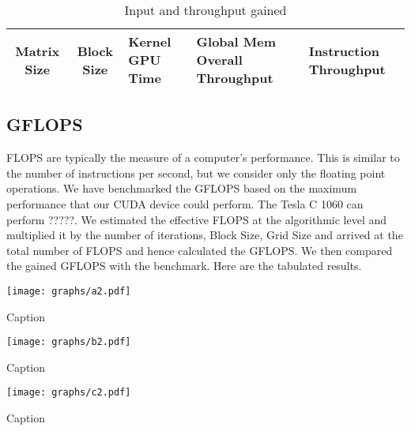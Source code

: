 \documentclass[10pt]{article}
\makeatletter
\newenvironment{figurehere}
    {\def\@captype{figure}}
    {}
\makeatother
\begin{document}
\begin{multicols}{2}
    \begin{table}\footnotesize
    \centering
        \begin{tabular}{ | c | c | p{1.2cm} | p{1.5cm} | p{1.0cm} | }
        \hline
        Matrix Size & Block Size & Kernel GPU Time & Global Mem Overall Throughput & Instruction Throughput \\
        \hline
        \end{tabular}
        \caption{Input and throughput gained}
        \label{tab:input_throughput}
    \end{table}

    \subsection{GFLOPS}
    FLOPS are typically the measure of a computer’s performance.
    This is similar to the number of instructions per second, but we consider only the floating point operations.
    We have benchmarked the GFLOPS based on the maximum performance that our CUDA device could perform.
    The Tesla C 1060 can perform ?????.
    We estimated the effective FLOPS at the algorithmic level and multiplied it by the number of iterations, Block Size, Grid Size and arrived at the total number of FLOPS and hence calculated the GFLOPS.
    We then compared the gained GFLOPS with the benchmark.
    Here are the tabulated results.

    \begin{center}
    \begin{figurehere}
        \texttt{[image: graphs/a2.pdf]}
        \caption{Caption}
        \label{fig:gflops1}
    \end{figurehere}
    \end{center}

    \begin{center}
    \begin{figurehere}
        \texttt{[image: graphs/b2.pdf]}
        \caption{Caption}
        \label{fig:gflops2}
    \end{figurehere}
    \end{center}

    \begin{center}
    \begin{figurehere}
        \texttt{[image: graphs/c2.pdf]}
        \caption{Caption}
        \label{fig:gflops3}
    \end{figurehere}
    \end{center}


\end{multicols}
\end{document}
